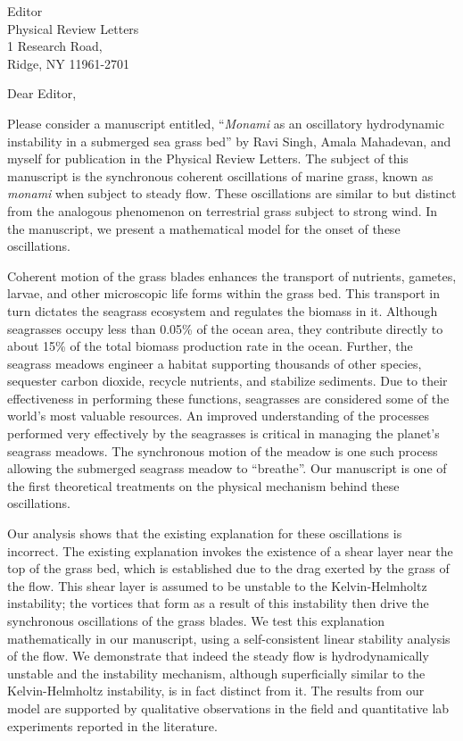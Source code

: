 \documentclass[10pt]{letter}
\date{\today}
\begin{document}
\begin{letter}{
Editor \\
Physical Review Letters \\
1 Research Road, \\
Ridge, NY 11961-2701 
}
\opening{Dear Editor,}

Please consider a manuscript entitled, ``{\it Monami} as an oscillatory hydrodynamic instability in a submerged sea grass bed'' by Ravi Singh, Amala Mahadevan, and myself for publication in the Physical Review Letters. The subject of this manuscript is the synchronous coherent oscillations of marine grass, known as {\it monami} when subject to steady flow. These oscillations are similar to but distinct from the analogous phenomenon on terrestrial grass subject to strong wind. In the manuscript, we present a mathematical model for the onset of these oscillations.

Coherent motion of the grass blades enhances the transport of nutrients, gametes, larvae, and other microscopic life forms within the grass bed. This transport in turn dictates the seagrass ecosystem and regulates the biomass in it. Although seagrasses occupy less than 0.05\% of the ocean area, they contribute directly to about 15\% of the total biomass production rate in the ocean. Further, the seagrass meadows engineer a habitat supporting thousands of other species, sequester carbon dioxide, recycle nutrients, and stabilize sediments. Due to their effectiveness in performing these functions, seagrasses are considered some of the world's most valuable resources. An improved understanding of the processes performed very effectively by the seagrasses is critical in managing the planet's seagrass meadows. The synchronous motion of the meadow is one such process allowing the submerged seagrass meadow to ``breathe''. Our manuscript is one of the first theoretical treatments on the physical mechanism behind these oscillations. 

Our analysis shows that the existing explanation for these oscillations is incorrect. The existing explanation invokes the existence of a shear layer near the top of the grass bed, which is established due to the drag exerted by the grass of the flow. This shear layer is assumed to be unstable to the Kelvin-Helmholtz instability; the vortices that form as a result of this instability then drive the synchronous oscillations of the grass blades. We test this explanation mathematically in our manuscript, using a self-consistent linear stability analysis of the flow. We demonstrate that indeed the steady flow is hydrodynamically unstable and the instability mechanism, although superficially similar to the Kelvin-Helmholtz instability, is in fact distinct from it. The results from our model are supported by qualitative observations in the field and quantitative lab experiments reported in the literature.


\end{letter}
\end{document}
